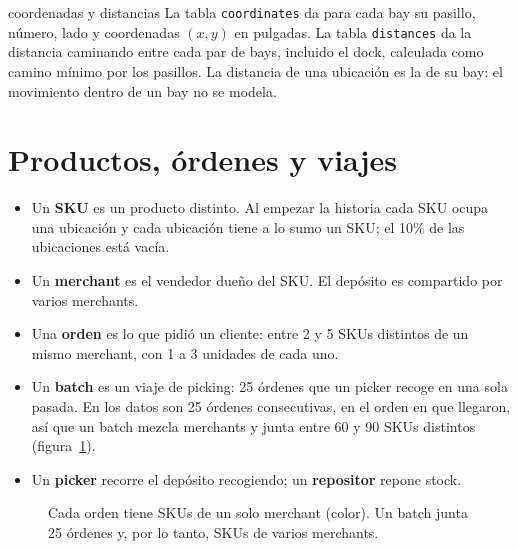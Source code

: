 \documentclass[11pt,a4paper,oneside]{report}
\newcommand{\code}[1]{\texttt{\small #1}}
\begin{document}
\begin{codigo}{coordenadas y distancias}
La tabla \code{coordinates} da para cada bay su pasillo, número, lado y coordenadas $(x, y)$
en pulgadas. La tabla \code{distances} da la distancia caminando entre cada par de bays,
incluido el dock, calculada como camino mínimo por los pasillos. La distancia de una
ubicación es la de su bay: el movimiento dentro de un bay no se modela.
\end{codigo}

\section{Productos, órdenes y viajes}

\begin{itemize}
  \item Un \textbf{SKU} es un producto distinto. Al empezar la historia cada SKU ocupa una
        ubicación y cada ubicación tiene a lo sumo un SKU; el 10\% de las ubicaciones está
        vacía.
  \item Un \textbf{merchant} es el vendedor dueño del SKU. El depósito es compartido por
        varios merchants.
  \item Una \textbf{orden} es lo que pidió un cliente: entre 2 y 5 SKUs distintos de un mismo
        merchant, con 1 a 3 unidades de cada uno.
  \item Un \textbf{batch} es un viaje de picking: 25 órdenes que un picker recoge en una sola
        pasada. En los datos son 25 órdenes consecutivas, en el orden en que llegaron, así que
        un batch mezcla merchants y junta entre 60 y 90 SKUs distintos
        (figura~\ref{fig:ordenes}).
  \item Un \textbf{picker} recorre el depósito recogiendo; un \textbf{repositor} repone stock.
\end{itemize}

\begin{figure}[ht]
\centering
{}
\caption{Cada orden tiene SKUs de un solo merchant (color). Un batch junta 25 órdenes y, por
lo tanto, SKUs de varios merchants.}
\label{fig:ordenes}
\end{figure}
\end{document}
